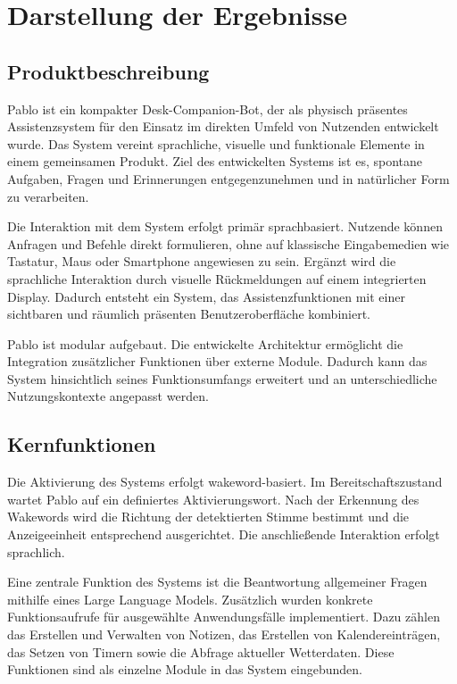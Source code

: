 \section{Darstellung der Ergebnisse}


\subsection{Produktbeschreibung}

Pablo ist ein kompakter Desk-Companion-Bot, der als physisch präsentes Assistenzsystem für den Einsatz im direkten Umfeld von Nutzenden entwickelt wurde. Das System vereint sprachliche, visuelle und funktionale Elemente in einem gemeinsamen Produkt. Ziel des entwickelten Systems ist es, spontane Aufgaben, Fragen und Erinnerungen entgegenzunehmen und in natürlicher Form zu verarbeiten.

Die Interaktion mit dem System erfolgt primär sprachbasiert. Nutzende können Anfragen und Befehle direkt formulieren, ohne auf klassische Eingabemedien wie Tastatur, Maus oder Smartphone angewiesen zu sein. Ergänzt wird die sprachliche Interaktion durch visuelle Rückmeldungen auf einem integrierten Display. Dadurch entsteht ein System, das Assistenzfunktionen mit einer sichtbaren und räumlich präsenten Benutzeroberfläche kombiniert.

Pablo ist modular aufgebaut. Die entwickelte Architektur ermöglicht die Integration zusätzlicher Funktionen über externe Module. Dadurch kann das System hinsichtlich seines Funktionsumfangs erweitert und an unterschiedliche Nutzungskontexte angepasst werden.

\subsection{Kernfunktionen}

Die Aktivierung des Systems erfolgt wakeword-basiert. Im Bereitschaftszustand wartet Pablo auf ein definiertes Aktivierungswort. Nach der Erkennung des Wakewords wird die Richtung der detektierten Stimme bestimmt und die Anzeigeeinheit entsprechend ausgerichtet. Die anschließende Interaktion erfolgt sprachlich.

Eine zentrale Funktion des Systems ist die Beantwortung allgemeiner Fragen mithilfe eines Large Language Models. Zusätzlich wurden konkrete Funktionsaufrufe für ausgewählte Anwendungsfälle implementiert. Dazu zählen das Erstellen und Verwalten von Notizen, das Erstellen von Kalendereinträgen, das Setzen von Timern sowie die Abfrage aktueller Wetterdaten. Diese Funktionen sind als einzelne Module in das System eingebunden.

